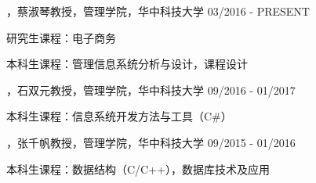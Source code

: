 
\begin{cventries}

\cvexperience
{，蔡淑琴教授，管理学院，华中科技大学}
{03/2016 - PRESENT}
{
    \begin{cvitems}
    \item {研究生课程：电子商务}
    \item {本科生课程：管理信息系统分析与设计，课程设计}
    \end{cvitems}
}

\cvexperience
{，石双元教授，管理学院，华中科技大学}
{09/2016 - 01/2017}
{
    \begin{cvitems}
    \item {本科生课程：信息系统开发方法与工具（C\#）}
    \end{cvitems}
}

\cvexperience
{，张千帆教授，管理学院，华中科技大学}
{09/2015 - 01/2016}
{
    \begin{cvitems}
    \item {本科生课程：数据结构（C/C++），数据库技术及应用}
    \end{cvitems}
}

\end{cventries}